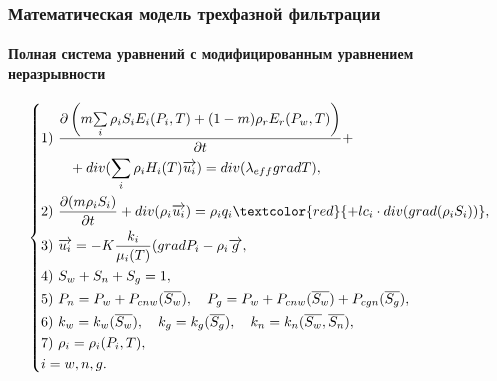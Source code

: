 \documentclass[10pt,pdf,hyperref={unicode}]{beamer} %
\begin{document}
\begin{frame}
\begin{center}
\frametitle{Математическая модель трехфазной фильтрации}
\framesubtitle{Полная система уравнений с модифицированным уравнением неразрывности}
\begin{equation*}
\left\{
  \begin{aligned}
    & \text{1)}\ \frac{\partial \left(m {\sum\limits_{i}{\rho_i S_i E_i(P_i, T)}} + (1-m){\rho_r E_r(P_w, T)}\right)}{\partial t} + \\
    & \qquad + div(\sum_{i}{\rho_i H_i(T) \overrightarrow{u_i}}) = div(\lambda_{eff} grad T),\\
    & \text{2)}\ \frac{\partial (m \rho_i S_i)}{\partial t}+ div(\rho_i \overrightarrow{u_i}) = \rho_i q_i\textcolor{red}{ + l c_i \cdot div(grad(\rho_i S_i))}, \\
    & \text{3)}\ \overrightarrow{u_i}=-K \frac{k_i}{{\mu_i(T)}}(grad P_i - {\rho}_i\overrightarrow{g},\\
    & \text{4)}\ S_w + S_n + S_g=1,\\
    & \text{5)}\ P_n=P_w+P_{cnw}(\overline{S_w}),\quad P_g=P_w+P_{cnw}(\overline{S_w})+P_{cgn}(\overline{S_g}),\\
    & \text{6)}\ k_w=k_w(\overline{S_w}),\quad k_g=k_g(\overline{S_g}),\quad k_n=k_n(\overline{S_w},\overline{S_n}),\\
    & \text{7)}\ \rho_i=\rho_i(P_i,T),\\
    &i=w,n,g. \\
  \end{aligned}
\right.
\end{equation*}
\end{center}
\end{frame}
\end{document}
